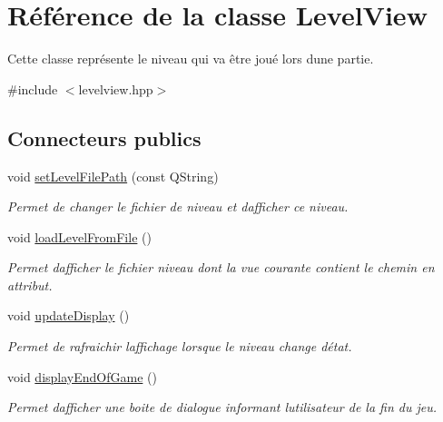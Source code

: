 \hypertarget{classLevelView}{}\section{Référence de la classe Level\+View}
\label{classLevelView}


Cette classe représente le niveau qui va être joué lors d\textquotesingle{}une partie.  




{\ttfamily \#include $<$levelview.\+hpp$>$}

\subsection*{Connecteurs publics}
\begin{DoxyCompactItemize}
\item 
void \hyperlink{classLevelView_ae8298aa5d3163d7cc1343adbb2676d8a}{set\+Level\+File\+Path} (const Q\+String)
\begin{DoxyCompactList}\small\item\em Permet de changer le fichier de niveau et d\textquotesingle{}afficher ce niveau. \end{DoxyCompactList}\item 
void \hyperlink{classLevelView_a3bded54066b2ce49cf972b16d03817bb}{load\+Level\+From\+File} ()
\begin{DoxyCompactList}\small\item\em Permet d\textquotesingle{}afficher le fichier niveau dont la vue courante contient le chemin en attribut. \end{DoxyCompactList}\item 
void \hyperlink{classLevelView_a3ada0dd54a12cc91a31113dd83553f3a}{update\+Display} ()
\begin{DoxyCompactList}\small\item\em Permet de rafraichir l\textquotesingle{}affichage lorsque le niveau change d\textquotesingle{}état. \end{DoxyCompactList}\item 
void \hyperlink{classLevelView_ad6ea3472fed0f3aa469779b6efac3b41}{display\+End\+Of\+Game} ()
\begin{DoxyCompactList}\small\item\em Permet d\textquotesingle{}afficher une boite de dialogue informant l\textquotesingle{}utilisateur de la fin du jeu. \end{DoxyCompactList}\end{DoxyCompactItemize}
